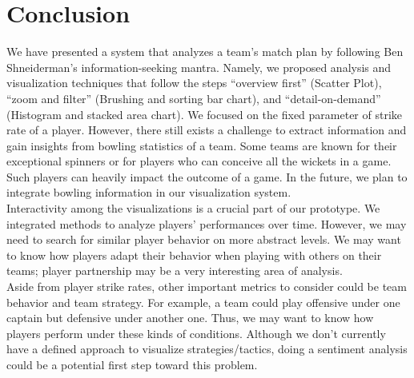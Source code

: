 \documentclass[10pt,journal,compsoc]{IEEEtran}
\begin{document}




\section{Conclusion}
We have presented a system that analyzes a team’s match plan by following Ben Shneiderman's information-seeking mantra\cite{mantra}. Namely, we proposed analysis and visualization techniques that follow the steps ``overview first'' (Scatter Plot), ``zoom and filter'' (Brushing and sorting bar chart), and ``detail-on-demand'' (Histogram and stacked area chart). We focused on the fixed parameter of strike rate of a player. However, there still exists a challenge to extract information and gain insights from bowling statistics of a team. Some teams are known for their exceptional spinners or for players who can conceive all the wickets in a game. Such players can heavily impact the outcome of a game. In the future, we plan to integrate bowling information in our visualization system.\\

\indent Interactivity among the visualizations is a crucial part of our prototype. We integrated methods to analyze players’ performances over time. However, we may need to search  for  similar  player  behavior  on  more abstract levels. We may want to know how players adapt their behavior when playing with others on their teams; player partnership may be a very interesting area of analysis. \\

\indent Aside from player strike rates, other important metrics to consider could be team behavior and team strategy. For example, a team could play offensive under one captain but defensive under another one. Thus, we may want to know how players perform under these kinds of conditions. Although we don’t currently have a defined approach to visualize strategies/tactics, doing a sentiment analysis could be a potential first step toward this problem.



\end{document}
